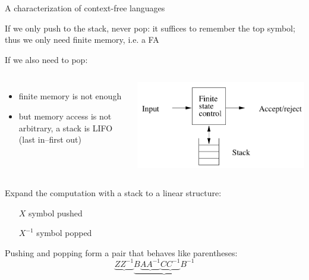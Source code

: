\documentclass[handout]{beamer}
\begin{document}
\begin{frame}{A characterization of context-free languages}

    If we only push to the stack, \alert{never pop}: it suffices to remember the top symbol; thus we only need \alert{finite memory}, i.e. a FA

    If we also need to pop:
    
    \vspace{-6pt}
    \begin{columns}


        \begin{itemize}
            \item finite memory is not enough
            \item but memory access is not arbitrary, a stack is LIFO (last in--first out)
        \end{itemize}
        

        \includegraphics[scale=0.4]{files/pushDown.PNG}
                
    \end{columns}
    
    Expand the computation with a stack to a linear structure:
    \begin{itemize}
        \item[$X$] symbol pushed
        \item[$X^{-1}$] symbol popped
    \end{itemize}

    Pushing and popping form a pair that behaves like parentheses:
    $$
    \underbrace{ZZ^{-1}}\underbrace{B\underbrace{AA^{-1}}\underbrace{CC^{-1}}B^{-1}}
    $$

\end{frame}
\end{document}
